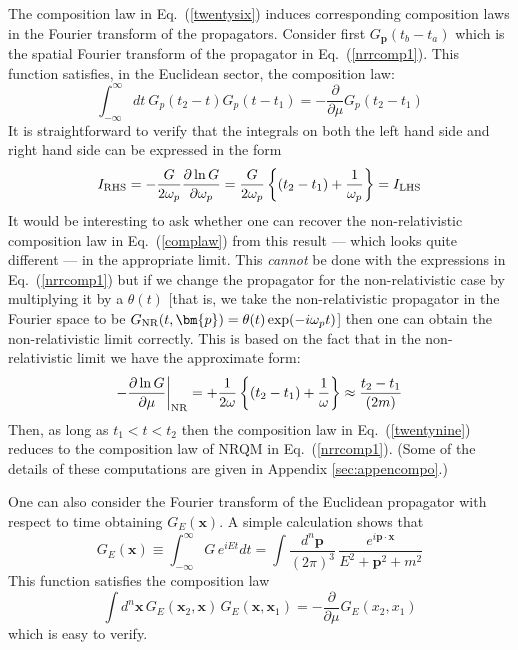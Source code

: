\documentclass{article}
\def\eq#1{{Eq.~(\ref{#1})}}
\begin{document}
The composition law in \eq{twentysix} induces corresponding composition laws in the Fourier transform of the propagators. Consider first $G_{\bm{p}}(t_b-t_a)$ which is the spatial Fourier transform of the propagator in \eq{nrrcomp1}. This function satisfies, in the Euclidean sector, the composition law: 
\begin{equation}
 \int_{-\infty}^\infty dt\ G_p(t_2 -t) G_p(t- t_1) = - \frac{\partial}{\partial \mu} G_p(t_2 - t_1)
 \label{twentynine}
\end{equation}
It is straightforward to verify that the integrals on both the left hand side and right hand side can be expressed in 
 the form
 \begin{equation}
 I_{\rm RHS}  = - \frac{G}{2\omega_p} \frac{\partial \ln G}{\partial \omega_p}
 =\frac{G}{2\omega_p} \left\{ (t_2-t_1) + \frac{1}{\omega_p}\right\}= I_{\rm LHS}
\end{equation}
 It would be interesting to ask whether  one can recover the non-relativistic composition law in \eq{complaw} from this result --- which looks quite different ---  in the appropriate limit. This \textit{cannot} be done with the expressions in \eq{nrrcomp1} but if we change the propagator for the non-relativistic case by multiplying it by a $\theta(t)$ [that is, we take the non-relativistic propagator in the Fourier space to be $G_{\rm NR}(t, \bm{p}) = \theta(t) \exp(-i\omega_p t)$] then one can  obtain the non-relativistic limit correctly. This is based on the fact that in the non-relativistic limit we have the approximate form:
 \begin{equation}
 -\frac{\partial \ln G}{\partial \mu} \bigg|_{\rm NR} = + \frac{1}{2\omega}  \left\{ (t_2-t_1) + \frac{1}{\omega}\right\}
 \approx \frac{t_2 - t_1}{(2m)}
\end{equation}
 Then, as long as $t_1<t<t_2$ then the composition law in \eq{twentynine} reduces to the composition law of NRQM in \eq{nrrcomp1}. (Some of the details of these computations are given in Appendix \ref{sec:appencompo}.)
 

 One can also consider the Fourier transform of the Euclidean propagator with respect to time obtaining $G_E (\bm{x})$. A simple calculation shows that 
\begin{equation}
 G_E(\bm{x}) \equiv \int_{-\infty}^\infty G \, e^{iEt} dt = \int \frac{d^n\bm{p}}{(2\pi)^3} \, \frac{e^{i\bm{p\cdot x}}}{E^2+ \bm{p}^2 + m^2}
\end{equation} 
 This function satisfies  the composition law 
\begin{equation}
 \int d^n \bm{x} \, G_E (\bm{x}_2, \bm{x}) \, G_E(\bm{x}, \bm{x}_1) = - \frac{\partial}{\partial \mu} G_E(x_2, x_1)
\end{equation} 
which is easy to verify. 
\end{document}
